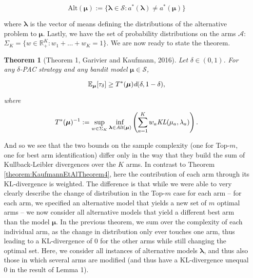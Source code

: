 \documentclass[12pt,]{article}
\newtheorem{theorem}{Theorem}
\begin{document}
\begin{equation*}
\text{Alt}(\bm{\mu}) := \{\bm{\lambda} \in \mathcal{S}: a^*(\bm{\lambda}) \neq a^*(\bm{\mu})\}
\end{equation*}

where \(\bm{\lambda}\) is the vector of means defining the distributions
of the alternative problem to \(\bm{\mu}\). Lastly, we have the set of
probability distributions on the arms \(\mathcal{A}\):
\(\Sigma_K = \{w \in \mathbb{R}_{+}^K: w_1 + \dots + w_K = 1\}\).
We are now ready to state the theorem.

\begin{theorem}[Theorem 1, Garivier and Kaufmann, 2016] \label{theorem:GarivierKaufmannTheorem1}
Let $\delta \in (0,1)$. For any $\delta$-PAC strategy and any bandit model $\bm{\mu} \in \mathcal{S}$,

\begin{equation*}
\mathbb{E}_{\bm{\mu}} [\tau_{\delta}] \geq T^*(\bm{\mu}) \text{\em{d}}(\delta,1-\delta),
\end{equation*}

where 

\begin{equation} \label{eq:GarivierKaufmann_Theorem1_Game}
T^*(\bm{\mu})^{-1} := \sup_{w \in \Sigma_K} \inf_{\bm{\lambda} \in \text{\em{Alt}}(\bm{\mu})} \left( \sum_{a=1}^K w_a \text{\em{KL}}(\mu_a, \lambda_a)\right).
\end{equation}
\end{theorem}

And so we see that the two bounds on the sample complexity (one for
Top-\(m\), one for best arm identification) differ only in the way that
they build the sum of Kullback-Leibler divergences over the \(K\) arms.
In contrast to Theorem \ref{theorem:KaufmannEtAlTheorem4}, here the
contribution of each arm through its KL-divergence is weighted. The
difference is that while we were able to very clearly describe the
change of distribution in the Top-\(m\) case for each arm -- for each
arm, we specified an alternative model that yields a new set of \(m\)
optimal arms -- we now consider all alternative models that yield a
different best arm than the model \(\bm{\mu}\). In the previous theorem,
we sum over the complexity of each individual arm, as the change in
distribution only ever touches one arm, thus leading to a KL-divergence
of 0 for the other arms while still changing the optimal set. Here, we
consider all instances of alternative models \(\bm{\lambda}\), and thus
also those in which several arms are modified (and thus have a
KL-divergence unequal 0 in the result of Lemma 1).
\end{document}
